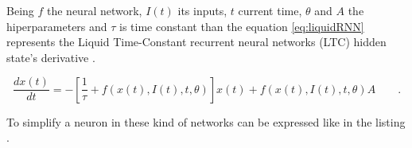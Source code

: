 \begin{frame}[allowframebreaks]
	\par Being $f$ the neural network, $I(t)$ its inputs, $t$ current time, $\theta$ and $A$ the hiperparameters and $\tau$ is time constant than the equation \ref{eq:liquidRNN} represents the Liquid Time-Constant recurrent neural networks (LTC) hidden state's derivative \cite{hasani2020liquid}.
	
	\begin{equation}
		\label{eq:liquidRNN}
		\dfrac{d x(t)}{dt} = - \left[\dfrac{1}{\tau} + f(x(t),I(t), t, \theta)\right] x(t) + f(x(t),I(t), t, \theta) A \qquad.
	\end{equation}
	
	\par To simplify a neuron in these kind of networks can be expressed like in the listing .
	
	
	
	
\end{frame}